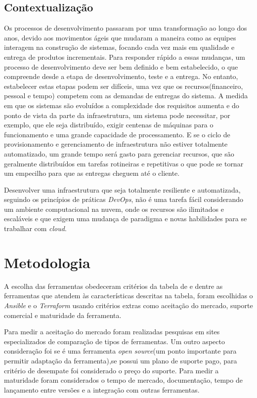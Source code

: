 \subsection{Contextualização}
Os processos de desenvolvimento passaram por uma transformação ao longo dos anos, devido aos movimentos ágeis que mudaram a maneira como as equipes interagem na construção de sistemas, focando cada vez mais em qualidade e entrega de produtos incrementais. Para responder rápido a essas mudanças, um processo de desenvolvimento deve ser bem definido e bem estabelecido, o que compreende desde a etapa de desenvolvimento, teste e a entrega. No entanto, estabelecer estas etapas podem ser difíceis, uma vez que os recursos(financeiro, pessoal e tempo) competem com as demandas de entregas do sistema. A medida em que os sistemas são evoluídos a complexidade dos requisitos aumenta e do ponto de vista da parte da infraestrutura, um sistema pode necessitar, por exemplo, que ele seja distribuído, exigir centenas de máquinas para o funcionamento e uma grande capacidade de processamento. E se o ciclo de provisionamento e gerenciamento de infraestrutura não estiver totalmente automatizado, um grande tempo será gasto para gerenciar recursos, que são geralmente distribuídos em tarefas rotineiras e repetitivas o que pode se tornar um empecilho para que as entregas cheguem até o cliente. 

Desenvolver uma infraestrutura que seja totalmente resiliente e automatizada, seguindo os princípios de práticas \textit{DevOps}, não é uma tarefa fácil considerando um ambiente computacional na nuvem, onde os recursos são ilimitados e escaláveis e que exigem uma mudança de paradigma e novas habilidades para se trabalhar com \textit{cloud}.  


\section{\esp Metodologia}

A escolha das ferramentas obedeceram critérios da tabela de  e dentre as ferramentas que atendem às características descritas na tabela, foram escolhidas o \textit{Ansible} e o \textit{Terraform} usando critérios extras como aceitação do mercado, suporte comercial e maturidade da ferramenta.

Para medir a aceitação do mercado foram realizadas pesquisas em sites especializados de comparação de tipos de ferramentas. Um outro aspecto consideração foi se é uma ferramenta \textit{open source}(um ponto importante para permitir adaptação da ferramenta),se possui um plano de suporte pago, para critério de desempate foi considerado o preço do suporte. Para medir a maturidade foram considerados o tempo de mercado, documentação, tempo de lançamento entre versões e a integração com outras ferramentas.

